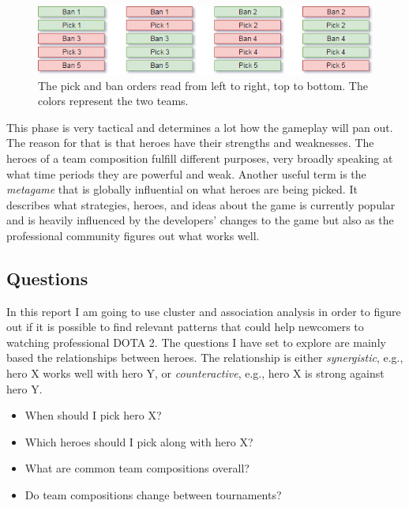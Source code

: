 \documentclass[report.tex]{subfiles}
\begin{document}
\begin{figure}[H]
  \centering
  \includegraphics[width=\textwidth]{./images/dota2}
  \caption{The pick and ban orders read from left to right, top to bottom. The colors represent the two teams.}
   \label{fig:picks_bans}
\end{figure}

This phase is very tactical and determines a lot how the gameplay will pan out. The reason for that is that heroes have their strengths and weaknesses. The heroes of a team composition fulfill different purposes, very broadly speaking at what time periods they are powerful and weak. Another useful term is the \textit{metagame} that is globally influential on what heroes are being picked. It describes what strategies, heroes, and ideas about the game is currently popular and is heavily influenced by the developers' changes to the game but also as the professional community figures out what works well.

\subsection*{Questions}

In this report I am going to use cluster and association analysis in order to figure out if it is possible to find relevant patterns that could help newcomers to watching professional DOTA 2. The questions I have set to explore are mainly based the relationships between heroes. The relationship is either \textit{synergistic}, e.g., hero X works well with hero Y, or \textit{counteractive}, e.g., hero X is strong against hero Y.

\begin{itemize}
\item When should I pick hero X?
\item Which heroes should I pick along with hero X?
\item What are common team compositions overall?
\item Do team compositions change between tournaments?
\end{itemize}
\end{document}
